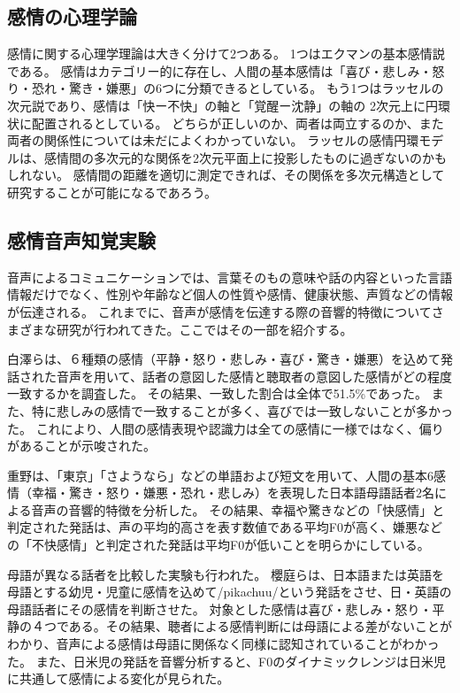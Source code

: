 \subsection{感情の心理学論}
\label{sec:PsychoEmo}
感情に関する心理学理論は大きく分けて2つある。
1つはエクマンの基本感情説\cite{ekman1992argument}である。
感情はカテゴリー的に存在し、人間の基本感情は「喜び・悲しみ・怒り・恐れ・驚き・嫌悪」の6つに分類できるとしている。
もう1つはラッセルの次元説\cite{russell1980circumplex}であり、感情は「快ー不快」の軸と「覚醒ー沈静」の軸の
2次元上に円環状に配置されるとしている。
どちらが正しいのか、両者は両立するのか、また両者の関係性については未だによくわかっていない。
ラッセルの感情円環モデルは、感情間の多次元的な関係を2次元平面上に投影したものに過ぎないのかもしれない。
感情間の距離を適切に測定できれば、その関係を多次元構造として研究することが可能になるであろう。


\subsection{感情音声知覚実験}
\label{sec:PreviousStudy}
音声によるコミュニケーションでは、言葉そのもの意味や話の内容といった言語情報だけでなく、性別や年齢など個人の性質や感情、健康状態、声質などの情報が伝達される。
これまでに、音声が感情を伝達する際の音響的特徴についてさまざまな研究が行われてきた。ここではその一部を紹介する。

白澤らは、６種類の感情（平静・怒り・悲しみ・喜び・驚き・嫌悪）を込めて発話された音声を用いて、話者の意図した感情と聴取者の意図した感情がどの程度一致するかを調査した\cite{shirasawa1996Emo}。
その結果、一致した割合は全体で51.5\%であった。
また、特に悲しみの感情で一致することが多く、喜びでは一致しないことが多かった。
これにより、人間の感情表現や認識力は全ての感情に一様ではなく、偏りがあることが示唆された。

重野は、「東京」「さようなら」などの単語および短文を用いて、人間の基本6感情（幸福・驚き・怒り・嫌悪・恐れ・悲しみ）を表現した日本語母語話者2名による音声の音響的特徴を分析した\cite{shigeno2004Emo}。
その結果、幸福や驚きなどの「快感情」と判定された発話は、声の平均的高さを表す数値である平均F0が高く、嫌悪などの「不快感情」と判定された発話は平均F0が低いことを明らかにしている。

母語が異なる話者を比較した実験も行われた。
櫻庭らは、日本語または英語を母語とする幼児・児童に感情を込めて/pikachuu/という発話をさせ、日・英語の母語話者にその感情を判断させた\cite{sakuraba2004Emo}。
対象とした感情は喜び・悲しみ・怒り・平静の４つである。その結果、聴者による感情判断には母語による差がないことがわかり、音声による感情は母語に関係なく同様に認知されていることがわかった。
また、日米児の発話を音響分析すると、F0のダイナミックレンジは日米児に共通して感情による変化が見られた。

